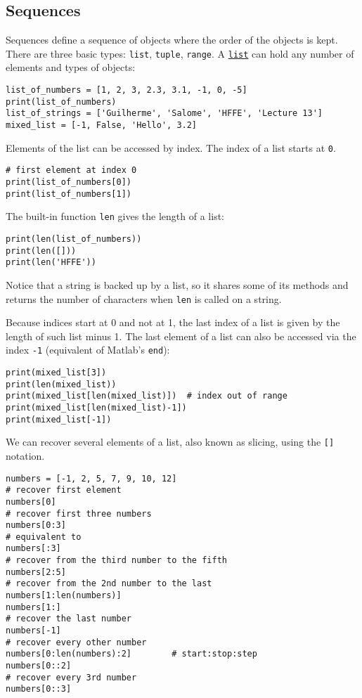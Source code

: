 \documentclass[12pt, a4paper]{article}
\begin{document}
\subsection{Sequences}
\label{sec:org0ce6d60}
Sequences define a sequence of objects where the order of the objects is kept.
There are three basic types: \texttt{list}, \texttt{tuple}, \texttt{range}.
A \href{https://docs.python.org/3.6/library/stdtypes.html\#list}{\texttt{list}} can hold any number of elements and types of objects:
\lstset{language=jupyter-python,label= ,caption= ,captionpos=b,numbers=none}
\begin{lstlisting}
list_of_numbers = [1, 2, 3, 2.3, 3.1, -1, 0, -5]
print(list_of_numbers)
list_of_strings = ['Guilherme', 'Salome', 'HFFE', 'Lecture 13']
mixed_list = [-1, False, 'Hello', 3.2]
\end{lstlisting}
Elements of the list can be accessed by index.
The index of a list starts at \texttt{0}.
\lstset{language=jupyter-python,label= ,caption= ,captionpos=b,numbers=none}
\begin{lstlisting}
# first element at index 0
print(list_of_numbers[0])
print(list_of_numbers[1])
\end{lstlisting}
The built-in function \texttt{len} gives the length of a list:
\lstset{language=jupyter-python,label= ,caption= ,captionpos=b,numbers=none}
\begin{lstlisting}
print(len(list_of_numbers))
print(len([]))
print(len('HFFE'))
\end{lstlisting}
Notice that a string is backed up by a list, so it shares some of its methods and returns the number of characters when \texttt{len} is called on a string.

Because indices start at 0 and not at 1, the last index of a list is given by the length of such list minus 1.
The last element of a list can also be accessed via the index \texttt{-1} (equivalent of Matlab's \texttt{end}):
\lstset{language=jupyter-python,label= ,caption= ,captionpos=b,numbers=none}
\begin{lstlisting}
print(mixed_list[3])
print(len(mixed_list))
print(mixed_list[len(mixed_list)])  # index out of range
print(mixed_list[len(mixed_list)-1])
print(mixed_list[-1])
\end{lstlisting}

We can recover several elements of a list, also known as slicing, using the \texttt{[]} notation.
\lstset{language=jupyter-python,label= ,caption= ,captionpos=b,numbers=none}
\begin{lstlisting}
numbers = [-1, 2, 5, 7, 9, 10, 12]
# recover first element
numbers[0]
# recover first three numbers
numbers[0:3]
# equivalent to
numbers[:3]
# recover from the third number to the fifth
numbers[2:5]
# recover from the 2nd number to the last
numbers[1:len(numbers)]
numbers[1:]
# recover the last number
numbers[-1]
# recover every other number
numbers[0:len(numbers):2]        # start:stop:step
numbers[0::2]
# recover every 3rd number
numbers[0::3]
\end{lstlisting}
\end{document}
